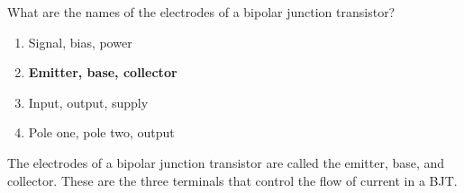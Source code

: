 \begin{tcolorbox}[colback=gray!10!white,colframe=black!75!black,title={T6B12}]
    What are the names of the electrodes of a bipolar junction transistor?
    \begin{enumerate}[label=\Alph*),noitemsep]
        \item Signal, bias, power
        \item \textbf{Emitter, base, collector}
        \item Input, output, supply
        \item Pole one, pole two, output
    \end{enumerate}
\end{tcolorbox}
The electrodes of a bipolar junction transistor are called the emitter, base, and collector. These are the three terminals that control the flow of current in a BJT.
